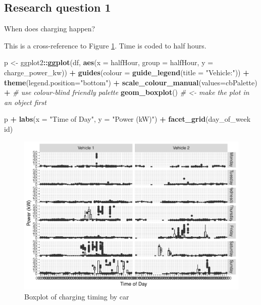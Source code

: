 \documentclass[]{article}
\newenvironment{Shaded}{\begin{snugshade}}{\end{snugshade}}
\newcommand{\KeywordTok}[1]{\textcolor[rgb]{0.13,0.29,0.53}{\textbf{#1}}}
\newcommand{\DataTypeTok}[1]{\textcolor[rgb]{0.13,0.29,0.53}{#1}}
\newcommand{\StringTok}[1]{\textcolor[rgb]{0.31,0.60,0.02}{#1}}
\newcommand{\CommentTok}[1]{\textcolor[rgb]{0.56,0.35,0.01}{\textit{#1}}}
\newcommand{\OperatorTok}[1]{\textcolor[rgb]{0.81,0.36,0.00}{\textbf{#1}}}
\newcommand{\NormalTok}[1]{#1}
\begin{document}
\subsection{Research question 1}\label{research-question-1}

When does charging happen?

This is a cross-reference to Figure \ref{fig:plot2}. Time is coded to
half hours.

\begin{Shaded}
\begin{Highlighting}[]
\NormalTok{p <-}\StringTok{ }\NormalTok{ggplot2}\OperatorTok{::}\KeywordTok{ggplot}\NormalTok{(df, }\KeywordTok{aes}\NormalTok{(}\DataTypeTok{x =}\NormalTok{ halfHour, }\DataTypeTok{group =}\NormalTok{ halfHour, }\DataTypeTok{y =}\NormalTok{ charge_power_kw)) }\OperatorTok{+}
\StringTok{  }\KeywordTok{guides}\NormalTok{(}\DataTypeTok{colour =} \KeywordTok{guide_legend}\NormalTok{(}\DataTypeTok{title =} \StringTok{"Vehicle:"}\NormalTok{)) }\OperatorTok{+}
\StringTok{  }\KeywordTok{theme}\NormalTok{(}\DataTypeTok{legend.position=}\StringTok{"bottom"}\NormalTok{) }\OperatorTok{+}
\StringTok{  }\KeywordTok{scale_colour_manual}\NormalTok{(}\DataTypeTok{values=}\NormalTok{cbPalette) }\OperatorTok{+}\StringTok{ }\CommentTok{# use colour-blind friendly palette}
\StringTok{  }\KeywordTok{geom_boxplot}\NormalTok{() }\CommentTok{# <- make the plot in an object first}

\NormalTok{p }\OperatorTok{+}\StringTok{ }\KeywordTok{labs}\NormalTok{(}\DataTypeTok{x =} \StringTok{"Time of Day"}\NormalTok{, }\DataTypeTok{y =} \StringTok{"Power (kW)"}\NormalTok{) }\OperatorTok{+}\StringTok{ }\KeywordTok{facet_grid}\NormalTok{(day_of_week }\OperatorTok{~}\StringTok{ }\NormalTok{id)}
\end{Highlighting}
\end{Shaded}

\begin{figure}
\centering
\includegraphics{EVBB_Report_files/figure-latex/plot2-1.pdf}
\caption{\label{fig:plot2}Boxplot of charging timing by car}
\end{figure}
\end{document}
